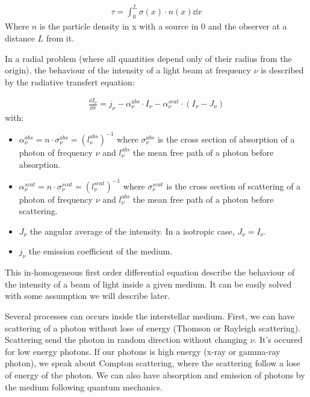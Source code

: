 \documentclass[10pt,a4paper,oneside]{article}
\begin{document}
\begin{multicols}{2}
\begin{align}
    \tau = \int _0 ^L \sigma(x)\cdot n(x)\dd x
\end{align}
Where $n$ is the particle density in x with a source in $0$ and the observer at a distance $L$ from it.

In a radial problem (where all quantities depend only of their radius from the origin), the behaviour of the intensity of a light beam at frequency $\nu$ is described by the radiative transfert equation: 

\begin{align}
\frac{\dd I_{\nu}}{\dd x}=j_{\nu}-\alpha _{\nu} ^{abs} \cdot I_{\nu} -\alpha _{\nu} ^{scat}\cdot (I_{\nu}-J_{\nu})
\end{align}
with: 
\begin{itemize}
    \item $\alpha _{\nu} ^{abs}=n \cdot \sigma_{\nu} ^{abs} =(l_{\nu} ^{abs})^{-1}$ where $\sigma _ {\nu} ^{abs}$ is the cross section of absorption of a photon of frequency $\nu$ and $l_{\nu} ^{abs}$ the mean free path of a photon before absorption. 
    
    \item $\alpha _{\nu} ^{scat}=n \cdot \sigma_{\nu} ^{scat} =(l_{\nu} ^{scat})^{-1}$ where $\sigma _ {\nu} ^{scat}$ is the cross section of scattering of a photon of frequency $\nu$ and $l_{\nu} ^{abs}$ the mean free path of a photon before scattering.
   \item $J_{\nu}$ the angular average of the intensity. In a isotropic case,  $J_{\nu}=I_{\nu}$. 
   \item $j_{\nu}$ the emission coefficient of the medium.  
\end{itemize}

This in-homogeneous first order differential equation describe the behaviour of the intensity of a beam of light inside a given medium. It can be easily solved with some assumption we will describe later. 

Several processes can occurs inside the interstellar medium. First, we can have scattering of a photon without lose of energy (Thomson or Rayleigh scattering). Scattering send the photon in random direction without changing $\nu$. It's occured for low energy photons. If our photons is high energy (x-ray or gamma-ray photon), we speak about Compton scattering, where the scattering follow a lose of energy of the photon. We can also have absorption and emission of photons by the medium following quantum mechanics. 


\end{multicols}
\end{document}
